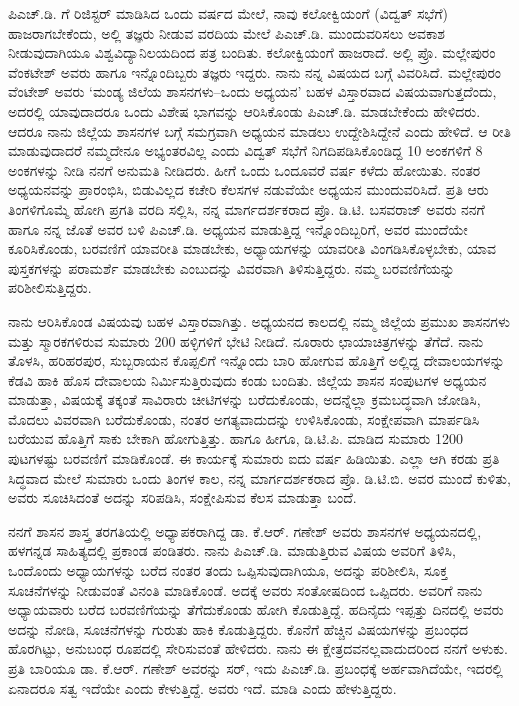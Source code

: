 ಪಿಎಚ್​.ಡಿ. ಗೆ ರಿಜಿಸ್ಟರ್​ ಮಾಡಿಸಿದ ಒಂದು ವರ್ಷದ ಮೇಲೆ, ನಾವು ಕಲೋಕ್ವಿಯಂಗೆ (ವಿದ್ವತ್​ ಸಭೆಗೆ) ಹಾಜರಾಗಬೇಕೆಂದು, ಅಲ್ಲಿ ತಜ್ಞರು ನೀಡುವ ವರದಿಯ ಮೇಲೆ ಪಿಎಚ್​.ಡಿ. ಮುಂದುವರಿಸಲು ಅವಕಾಶ ನೀಡುವುದಾಗಿಯೂ ವಿಶ್ವವಿದ್ಯಾನಿಲಯದಿಂದ ಪತ್ರ ಬಂದಿತು. ಕಲೋಕ್ವಿಯಂಗೆ ಹಾಜರಾದೆ. ಅಲ್ಲಿ ಪ್ರೊ. ಮಲ್ಲೇಪುರಂ ವೆಂಕಟೇಶ್​ ಅವರು ಹಾಗೂ ಇನ್ನೊಂದಿಬ್ಬರು ತಜ್ಞರು ಇದ್ದರು. ನಾನು ನನ್ನ ವಿಷಯದ ಬಗ್ಗೆ ವಿವರಿಸಿದೆ. ಮಲ್ಲೇಪುರಂ ವೆಂಟೇಶ್​ ಅವರು ‘ಮಂಡ್ಯ ಜಿಲೆಯ ಶಾಸನಗಳು–ಒಂದು ಅಧ್ಯಯನ’ ಬಹಳ ವಿಸ್ತಾರವಾದ ವಿಷಯವಾಗುತ್ತದೆಂದು, ಅದರಲ್ಲಿ ಯಾವುದಾದರೂ ಒಂದು ವಿಶೇಷ ಭಾಗವನ್ನು ಆರಿಸಿಕೊಂಡು ಪಿಎಚ್​.ಡಿ. ಮಾಡಬೇಕೆಂದು ಹೇಳಿದರು. ಆದರೂ ನಾನು ಜಿಲ್ಲೆಯ ಶಾಸನಗಳ ಬಗ್ಗೆ ಸಮಗ್ರವಾಗಿ ಅಧ್ಯಯನ ಮಾಡಲು ಉದ್ದೇಶಿಸಿದ್ದೇನೆ ಎಂದು ಹೇಳಿದೆ. ಆ ರೀತಿ ಮಾಡುವುದಾದರೆ ನಮ್ಮದೇನೂ ಅಭ್ಯಂತರವಿಲ್ಲ ಎಂದು ವಿದ್ವತ್​ ಸಭೆಗೆ ನಿಗದಿಪಡಿಸಿಕೊಂಡಿದ್ದ 10 ಅಂಕಗಳಿಗೆ 8 ಅಂಕಗಳನ್ನು ನೀಡಿ ನನಗೆ ಅನುಮತಿ ನೀಡಿದರು. ಹೀಗೆ ಒಂದು ಒಂದೂವರೆ ವರ್ಷ ಕಳೆದು ಹೋಯಿತು. ನಂತರ ಅಧ್ಯಯನವನ್ನು ಪ್ರಾರಂಭಿಸಿ, ಬಿಡುವಿಲ್ಲದ ಕಚೇರಿ ಕೆಲಸಗಳ ನಡುವೆಯೇ ಅಧ್ಯಯನ ಮುಂದುವರಿಸಿದೆ. ಪ್ರತಿ ಆರು ತಿಂಗಳಿಗೊಮ್ಮೆ ಹೋಗಿ ಪ್ರಗತಿ ವರದಿ ಸಲ್ಲಿಸಿ, ನನ್ನ ಮಾರ್ಗದರ್ಶಕರಾದ ಪ್ರೊ. ಡಿ.ಟಿ. ಬಸವರಾಜ್​ ಅವರು ನನಗೆ ಹಾಗೂ ನನ್ನ ಜೊತೆ ಅವರ ಬಳಿ ಪಿಎಚ್​.ಡಿ. ಅಧ್ಯಯನ ಮಾಡುತ್ತಿದ್ದ ಇನ್ನೊಂದಿಬ್ಬರಿಗೆ, ಅವರ ಮುಂದೆಯೇ ಕೂರಿಸಿಕೊಂಡು, ಬರವಣಿಗೆ ಯಾವರೀತಿ ಮಾಡಬೇಕು, ಅಧ್ಯಾಯಗಳನ್ನು ಯಾವರೀತಿ ವಿಂಗಡಿಸಿಕೊಳ್ಳಬೇಕು, ಯಾವ ಪುಸ್ತಕಗಳನ್ನು ಪರಾಮರ್ಶೆ ಮಾಡಬೇಕು ಎಂಬುದನ್ನು ವಿವರವಾಗಿ ತಿಳಿಸುತ್ತಿದ್ದರು. ನಮ್ಮ ಬರವಣಿಗೆಯನ್ನು ಪರಿಶೀಲಿಸುತ್ತಿದ್ದರು. 

ನಾನು ಆರಿಸಿಕೊಂಡ ವಿಷಯವು ಬಹಳ ವಿಸ್ತಾರವಾಗಿತ್ತು. ಅಧ್ಯಯನದ ಕಾಲದಲ್ಲಿ ನಮ್ಮ ಜಿಲ್ಲೆಯ ಪ್ರಮುಖ ಶಾಸನಗಳು ಮತ್ತು ಸ್ಮಾರಕಗಳಿರುವ ಸುಮಾರು 200 ಹಳ್ಳಿಗಳಿಗೆ ಭೇಟಿ ನೀಡಿದೆ. ನೂರಾರು ಛಾಯಾಚಿತ್ರಗಳನ್ನು ತೆಗೆದೆ. ನಾನು ತೊಳಸಿ, ಹರಿಹರಪುರ, ಸುಬ್ಬರಾಯನ ಕೊಪ್ಪಲಿಗೆ ಇನ್ನೊಂದು ಬಾರಿ ಹೋಗುವ ಹೊತ್ತಿಗೆ ಅಲ್ಲಿದ್ದ ದೇವಾಲಯಗಳನ್ನು ಕೆಡವಿ ಹಾಕಿ ಹೊಸ ದೇವಾಲಯ ನಿರ್ಮಿಸುತ್ತಿರುವುದು ಕಂಡು ಬಂದಿತು. ಜಿಲ್ಲೆಯ ಶಾಸನ ಸಂಪುಟಗಳ ಅಧ್ಯಯನ ಮಾಡುತ್ತಾ, ವಿಷಯಕ್ಕೆ ತಕ್ಕಂತೆ ಸಾವಿರಾರು ಚೀಟಿಗಳನ್ನು ಬರೆದುಕೊಂಡು, ಅದನ್ನೆಲ್ಲಾ ಕ್ರಮಬದ್ಧವಾಗಿ ಜೋಡಿಸಿ, ಮೊದಲು ವಿವರವಾಗಿ ಬರೆದುಕೊಂಡು, ನಂತರ ಅಗತ್ಯವಾದುದನ್ನು ಉಳಿಸಿಕೊಂಡು, ಸಂಕ್ಷೇಪವಾಗಿ ಮಾರ್ಪಡಿಸಿ ಬರೆಯುವ ಹೊತ್ತಿಗೆ ಸಾಕು ಬೇಕಾಗಿ ಹೋಗುತ್ತಿತ್ತು. ಹಾಗೂ ಹೀಗೂ, ಡಿ.ಟಿ.ಪಿ. ಮಾಡಿದ ಸುಮಾರು 1200 ಪುಟಗಳಷ್ಟು ಬರವಣಿಗೆ ಮಾಡಿಕೊಂಡೆ. ಈ ಕಾರ್ಯಕ್ಕೆ ಸುಮಾರು ಐದು ವರ್ಷ ಹಿಡಿಯಿತು. ಎಲ್ಲಾ ಆಗಿ ಕರಡು ಪ್ರತಿ ಸಿದ್ಧವಾದ ಮೇಲೆ ಸುಮಾರು ಒಂದು ತಿಂಗಳ ಕಾಲ, ನನ್ನ ಮಾರ್ಗದರ್ಶಕರಾದ ಪ್ರೊ. ಡಿ.ಟಿ.ಬಿ. ಅವರ ಮುಂದೆ ಕುಳಿತು, ಅವರು ಸೂಚಿಸಿದಂತೆ ಅದನ್ನು ಸರಿಪಡಿಸಿ, ಸಂಕ್ಷೇಪಿಸುವ ಕೆಲಸ ಮಾಡುತ್ತಾ ಬಂದೆ. 

ನನಗೆ ಶಾಸನ ಶಾಸ್ತ್ರ ತರಗತಿಯಲ್ಲಿ ಅಧ್ಯಾಪಕರಾಗಿದ್ದ ಡಾ. ಕೆ.ಆರ್​. ಗಣೇಶ್​ ಅವರು ಶಾಸನಗಳ ಅಧ್ಯಯನದಲ್ಲಿ, ಹಳಗನ್ನಡ ಸಾಹಿತ್ಯದಲ್ಲಿ ಪ್ರಕಾಂಡ ಪಂಡಿತರು. ನಾನು ಪಿಎಚ್​.ಡಿ. ಮಾಡುತ್ತಿರುವ ವಿಷಯ ಅವರಿಗೆ ತಿಳಿಸಿ, ಒಂದೊಂದು ಅಧ್ಯಾಯಗಳನ್ನು ಬರೆದ ನಂತರ ತಂದು ಒಪ್ಪಿಸುವುದಾಗಿಯೂ, ಅದನ್ನು ಪರಿಶೀಲಿಸಿ, ಸೂಕ್ತ ಸೂಚನೆಗಳನ್ನು ನೀಡುವಂತೆ ವಿನಂತಿ ಮಾಡಿಕೊಂಡೆ. ಅದಕ್ಕೆ ಅವರು ಸಂತೋಷದಿಂದ ಒಪ್ಪಿದರು. ಅವರಿಗೆ ನಾನು ಅಧ್ಯಾಯವಾರು ಬರೆದ ಬರವಣಿಗೆಯನ್ನು ತೆಗೆದುಕೊಂಡು ಹೋಗಿ ಕೊಡುತ್ತಿದ್ದೆ. ಹದಿನೈದು ಇಪ್ಪತ್ತು ದಿನದಲ್ಲಿ ಅವರು ಅದನ್ನು ನೋಡಿ, ಸೂಚನೆಗಳನ್ನು ಗುರುತು ಹಾಕಿ ಕೊಡುತ್ತಿದ್ದರು. ಕೊನೆಗೆ ಹೆಚ್ಚಿನ ವಿಷಯಗಳನ್ನು ಪ್ರಬಂಧದ ಹೊರಗಿಟ್ಟು, ಅನುಬಂಧ ರೂಪದಲ್ಲಿ ಸೇರಿಸುವಂತೆ ಹೇಳಿದರು. ನಾನು ಈ ಕ್ಷೇತ್ರದವನಲ್ಲವಾದುದರಿಂದ ನನಗೆ ಅಳುಕು. ಪ್ರತಿ ಬಾರಿಯೂ ಡಾ. ಕೆ.ಆರ್​. ಗಣೇಶ್​ ಅವರನ್ನು ಸರ್​, ಇದು ಪಿಎಚ್​.ಡಿ. ಪ್ರಬಂಧಕ್ಕೆ ಅರ್ಹವಾಗಿದೆಯೇ, ಇದರಲ್ಲಿ ಏನಾದರೂ ಸತ್ವ ಇದೆಯೇ ಎಂದು ಕೇಳುತ್ತಿದ್ದೆ. ಅವರು ಇದೆ. ಮಾಡಿ ಎಂದು ಹೇಳುತ್ತಿದ್ದರು.

